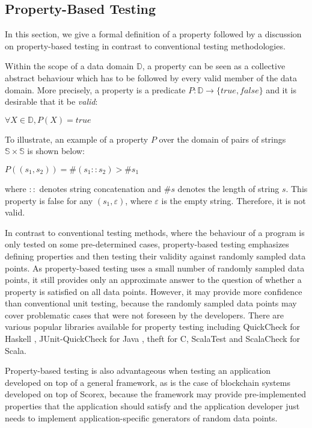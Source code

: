 
\newcommand{\avector}[2]{(#1_1,#1_2,\ldots,#1_{#2})}
\newcommand{\aDEFvector}[2][a]{(#1_1,#1_2,\ldots,#1_{#2})}

\subsection{Property-Based Testing}
In this section, we give a formal definition of a property followed by a discussion on property-based testing in contrast to conventional testing methodologies.

Within the scope of a data domain $\mathbb{D}$, a property can be seen as a collective abstract behaviour which has to be followed by every valid member of the data domain. More precisely, a property is a predicate $P: \mathbb{D} \rightarrow \{true, false\}$ and it is desirable that it be \emph{valid}: 
\begin{center}
$\forall X \in \mathbb{D}, P(X) = true$
\end{center}
To illustrate, an example of a property $P$ over the domain of pairs of strings $\mathbb{S} \times \mathbb{S}$ is shown below:
\begin{center}
$P((s_1, s_2)) = \#(s_1::s_2) > \#s_1$
\end{center}
where $::$ denotes string concatenation and $\#s$ denotes the length of string $s$. This property is false for any $(s_1, \varepsilon)$, where $\varepsilon$ is the empty string. Therefore, it is not valid.

In contrast to conventional testing methods, where the behaviour of a program is only tested on some pre-determined cases, property-based testing \cite{ron2001property} emphasizes defining properties and then testing their validity against randomly sampled data points. As property-based testing uses a small number of randomly sampled data points, it still provides only an approximate answer to the question of whether a property is satisfied on all data points. However, it may provide more confidence than conventional unit testing, because the randomly sampled data points may cover problematic cases that were not foreseen by the developers. There are various popular libraries available for property testing including QuickCheck for Haskell \cite{claessen2011quickcheck}, JUnit-QuickCheck for Java \cite{jung2015quickcheck}, theft for C, ScalaTest \cite{venners2009scalatest} and ScalaCheck \cite{nilsson2014scalacheck} for Scala.

Property-based testing is also advantageous when testing an application developed on top of a general framework, as is the case of blockchain systems developed on top of Scorex, because the framework may provide pre-implemented properties that the application should satisfy and the application developer just needs to implement application-specific generators of random data points.
\nocite{holzmann1995improvement}
\nocite{zaki2008formal}
